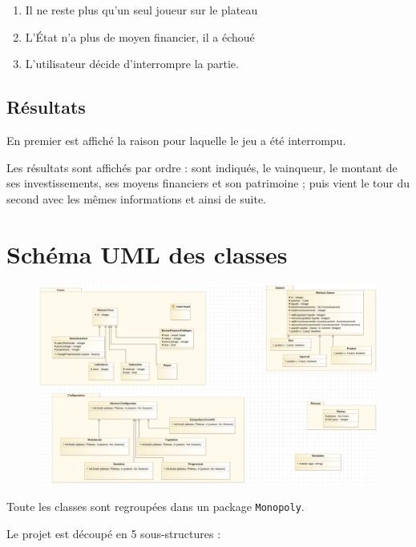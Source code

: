 \documentclass[11pt, a4paper]{report}
\begin{document}
	\begin{enumerate}
		
		\item Il ne reste plus qu'un seul joueur sur le plateau
		
		\item L'État n'a plus de moyen financier, il a échoué
		
		\item L'utilisateur décide d'interrompre la partie.
		
	\end{enumerate}
	
	
	\section{Résultats}
	
	En premier est affiché la raison pour laquelle le jeu a été interrompu.
	
	Les résultats sont affichés par ordre : sont indiqués, le vainqueur, le montant de ses investissements, ses moyens financiers et son patrimoine ; puis vient le tour du second avec les mêmes informations et ainsi de suite.
	
	
	
	\chapter{Schéma UML des classes}
	
	\begin{figure}[h]
		\centering
		\includegraphics[width=1\textwidth]{images/UML2.png}
	\end{figure}
	
	Toute les classes sont regroupées dans un package \verb|Monopoly|.
	
	Le projet est découpé en 5 sous-structures :
	
\end{document}
